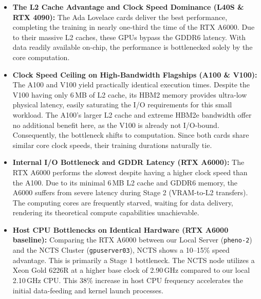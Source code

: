 \documentclass[12pt]{article}
\begin{document}
        \begin{itemize}
            \item \textbf{The L2 Cache Advantage and Clock Speed Dominance (L40S \& RTX 4090):} 
            The Ada Lovelace cards deliver the best performance, completing the training in nearly one-third the time of the RTX A6000. Due to their massive L2 caches, these GPUs bypass the GDDR6 latency. With data readily available on-chip, the performance is bottlenecked solely by the core computation.

            \item \textbf{Clock Speed Ceiling on High-Bandwidth Flagships (A100 \& V100):} 
            The A100 and V100 yield practically identical execution times. Despite the V100 having only 6\,MB of L2 cache, its HBM2 memory provides ultra-low physical latency, easily saturating the I/O requirements for this small workload. The A100's larger L2 cache and extreme HBM2e bandwidth offer no additional benefit here, as the V100 is already not I/O-bound. Consequently, the bottleneck shifts to computation. Since both cards share similar core clock speeds, their training durations naturally tie.

            \item \textbf{Internal I/O Bottleneck and GDDR Latency (RTX A6000):} 
            The RTX A6000 performs the slowest despite having a higher clock speed than the A100. Due to its minimal 6\,MB L2 cache and  GDDR6 memory, the A6000 suffers from severe latency during Stage 2 (VRAM-to-L2 transfers). The computing cores are frequently starved, waiting for data delivery, rendering its theoretical compute capabilities unachievable.

            \item \textbf{Host CPU Bottlenecks on Identical Hardware (RTX A6000 baseline):} 
            Comparing the RTX A6000 between our Local Server (\texttt{pheno-2}) and the NCTS Cluster (\texttt{gpuserver03}), NCTS shows a 10--15\% speed advantage. This is primarily a Stage 1 bottleneck. The NCTS node utilizes a Xeon Gold 6226R at a higher base clock of 2.90\,GHz compared to our local 2.10\,GHz CPU. This 38\% increase in host CPU frequency accelerates the initial data-feeding and kernel launch processes.
        \end{itemize}



% 
% 
\end{document}

